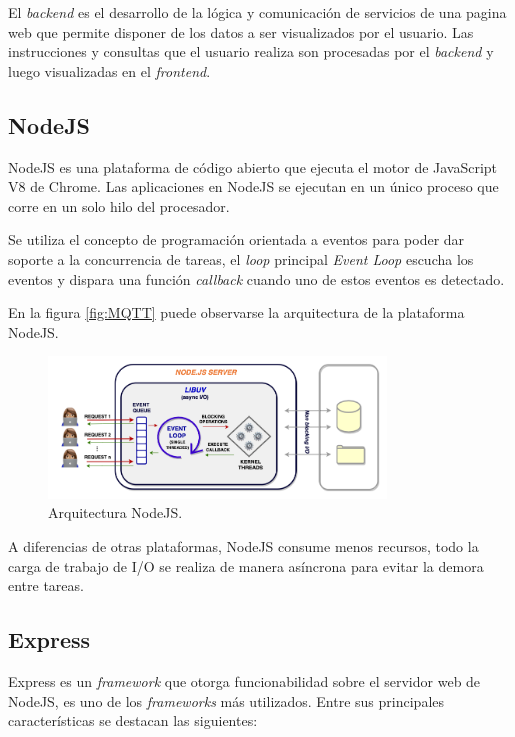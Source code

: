 El \textit{backend} es el desarrollo de la lógica y comunicación de servicios de una pagina web que permite disponer de los datos a ser visualizados por el usuario. Las instrucciones y consultas que el usuario realiza son procesadas por el \textit{backend} y luego visualizadas en el \textit{frontend}.

 
\subsection{NodeJS}
NodeJS es una plataforma de código abierto que ejecuta el motor de JavaScript V8 de Chrome. Las aplicaciones en NodeJS se ejecutan en un único proceso que corre en un solo hilo del procesador. 

Se utiliza el concepto de programación orientada a eventos para poder dar soporte a la concurrencia de tareas, el \textit{loop} principal \textit{Event Loop}  escucha los eventos y dispara una función \textit{callback} cuando uno de estos eventos es detectado\citep{node}. 

En la figura \ref{fig:MQTT} puede observarse la arquitectura de la plataforma NodeJS.

\begin{figure}[htbp]
	\centering
	\includegraphics[width=0.8\textwidth]{./Figures/NODEJS.png}
	\caption{Arquitectura NodeJS.}
	\label{fig:NODEJS}
\end{figure}

A diferencias de otras plataformas, NodeJS consume menos recursos, todo la carga de trabajo de I/O se realiza de manera asíncrona para evitar la demora entre tareas.

\subsection{Express}
Express es un \textit{framework} que otorga funcionabilidad sobre el servidor web de NodeJS, es uno de los \textit{frameworks} más utilizados. Entre sus principales características se destacan las siguientes\citep{expr}:

